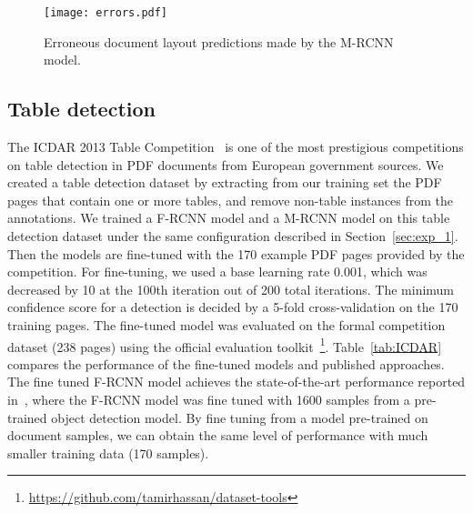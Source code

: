 \documentclass[conference]{IEEEtran}
\begin{document}
\begin{figure*}[!htb]
  \centering
  \texttt{[image: errors.pdf]}
  \caption{Erroneous document layout predictions made by the M-RCNN model.}
  \label{fig:errors}
\end{figure*}

\subsection{Table detection}

The ICDAR 2013 Table Competition~\cite{gobel2013icdar} is one of the most prestigious competitions on table detection in PDF documents from European government sources. We created a table detection dataset by extracting from our training set the PDF pages that contain one or more tables, and remove non-table instances from the annotations. We trained a F-RCNN model and a M-RCNN model on this table detection dataset under the same configuration described in Section~\ref{sec:exp_1}. Then the models are fine-tuned with the 170 example PDF pages provided by the competition. For fine-tuning, we used a base learning rate 0.001, which was decreased by 10 at the 100th iteration out of 200 total iterations. The minimum confidence score for a detection is decided by a 5-fold cross-validation on the 170 training pages. The fine-tuned model was evaluated on the formal competition dataset (238 pages) using the official evaluation toolkit~\footnote{\url{https://github.com/tamirhassan/dataset-tools}}. Table~\ref{tab:ICDAR} compares the performance of the fine-tuned models and published approaches. The fine tuned F-RCNN model achieves the state-of-the-art performance reported in~\cite{schreiber2017deepdesrt}, where the F-RCNN model was fine tuned with 1600 samples from a pre-trained object detection model. By fine tuning from a model pre-trained on document samples, we can obtain the same level of performance with much smaller training data (170 samples).
\end{document}
